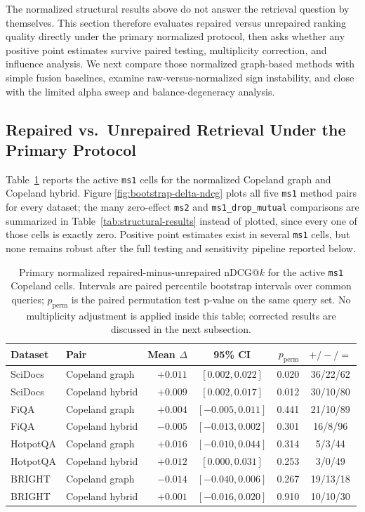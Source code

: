 \documentclass[manuscript,anonymous,review]{acmart}
\begin{document}
The normalized structural results above do not answer the retrieval question by
themselves. This section therefore evaluates repaired versus unrepaired ranking
quality directly under the primary normalized protocol, then asks whether any
positive point estimates survive paired testing, multiplicity correction, and
influence analysis. We next compare those normalized graph-based methods with
simple fusion baselines, examine raw-versus-normalized sign instability, and
close with the limited alpha sweep and balance-degeneracy analysis.

\subsection{Repaired vs.\ Unrepaired Retrieval Under the Primary Protocol}

Table~\ref{tab:bootstrap-delta-ndcg} reports the active \texttt{ms1} cells for
the normalized Copeland graph and Copeland hybrid. Figure
\ref{fig:bootstrap-delta-ndcg} plots all five \texttt{ms1} method pairs for
every dataset; the many zero-effect \texttt{ms2} and \texttt{ms1\_drop\_mutual}
comparisons are summarized in Table~\ref{tab:structural-results} instead of
plotted, since every one of those cells is exactly zero. Positive point
estimates exist in several \texttt{ms1} cells, but none remains robust after
the full testing and sensitivity pipeline reported below.

\begin{table}[t]
  \caption{Primary normalized repaired-minus-unrepaired nDCG@$k$ for the
    active \texttt{ms1} Copeland cells. Intervals are paired percentile
    bootstrap intervals over common queries; $p_{\mathrm{perm}}$ is the paired
    permutation test p-value on the same query set. No multiplicity adjustment
    is applied inside this table; corrected results are discussed in the next
    subsection.}
  \label{tab:bootstrap-delta-ndcg}
  \scriptsize
  \begin{tabular}{llrcrc}
    \toprule
    Dataset & Pair & Mean $\Delta$ & 95\% CI & $p_{\mathrm{perm}}$ & $+/-/=$ \\
    \midrule
    SciDocs  & Copeland graph  & $+0.011$ & $[0.002, 0.022]$  & 0.020 & 36/22/62 \\
    SciDocs  & Copeland hybrid & $+0.009$ & $[0.002, 0.017]$  & 0.012 & 30/10/80 \\
    FiQA     & Copeland graph  & $+0.004$ & $[-0.005, 0.011]$ & 0.441 & 21/10/89 \\
    FiQA     & Copeland hybrid & $-0.005$ & $[-0.013, 0.002]$ & 0.301 & 16/8/96 \\
    HotpotQA & Copeland graph  & $+0.016$ & $[-0.010, 0.044]$ & 0.314 & 5/3/44 \\
    HotpotQA & Copeland hybrid & $+0.012$ & $[0.000, 0.031]$  & 0.253 & 3/0/49 \\
    BRIGHT   & Copeland graph  & $-0.014$ & $[-0.040, 0.006]$ & 0.267 & 19/13/18 \\
    BRIGHT   & Copeland hybrid & $+0.001$ & $[-0.016, 0.020]$ & 0.910 & 10/10/30 \\
    \bottomrule
  \end{tabular}
\end{table}
\end{document}
